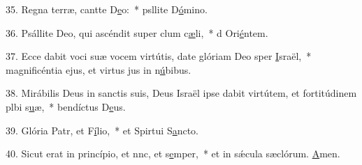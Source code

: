 35. Regna terræ, cantte D\uline{e}o:~* psllite D\uline{ó}mino.\par 
36. Psállite Deo, qui ascéndit super clum c\uline{æ}li,~* d Ori\uline{é}ntem.\par 
37. Ecce dabit voci suæ vocem virtútis, date glóriam Deo sper \uline{I}sraël,~* magnificéntia ejus, et virtus jus in n\uline{ú}bibus.\par 
38. Mirábilis Deus in sanctis suis, Deus Israël ipse dabit virtútem, et fortitúdinem plbi s\uline{u}æ,~* bendíctus D\uline{e}us.\par 
39. Glória Patr, et F\uline{í}lio,~* et Spirtui S\uline{a}ncto.\par 
40. Sicut erat in princípio, et nnc, et s\uline{e}mper,~* et in sǽcula sæclórum. \uline{A}men.\par 
